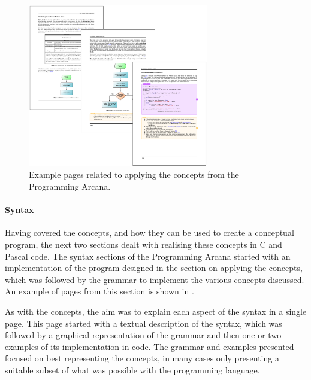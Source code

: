 \begin{figure}[h]
  \centering
  \includegraphics[width=0.7\textwidth]{ArcanaApplying}
  \caption{Example pages related to applying the concepts from the Programming Arcana.}
  \label{fig:arcana_applying}
\end{figure}


\clearpage
\paragraph{Syntax} %
\label{par:syntax}

Having covered the concepts, and how they can be used to create a conceptual program, the next two sections dealt with realising these concepts in C and Pascal code. The syntax sections of the Programming Arcana started with an implementation of the program designed in the section on applying the concepts, which was followed by the grammar to implement the various concepts discussed. An example of pages from this section is shown in .

As with the concepts, the aim was to explain each aspect of the syntax in a single page. This page started with a textual description of the syntax, which was followed by a graphical representation of the grammar and then one or two examples of its implementation in code. The grammar and examples presented focused on best representing the concepts, in many cases only presenting a suitable subset of what was possible with the programming language. 

